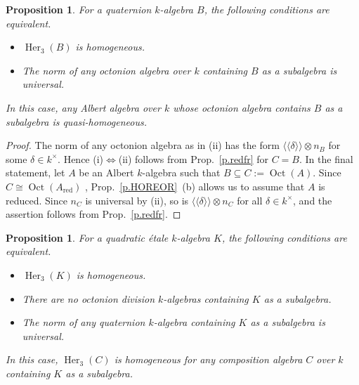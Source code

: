 \documentclass{amsart}
\newtheorem{prop}[equation]{Proposition}
\theoremstyle{definition} %
\theoremstyle{remark} %
\DeclareMathOperator{\red}{red}
\DeclareMathOperator{\Oct}{Oct}
\newcommand{\dla}{\langle\langle}
\newcommand{\dra}{\rangle\rangle}
\renewcommand{\:}{\colon\,}
\DeclareMathOperator{\Her}{Her}
\numberwithin{equation}{section}
\begin{document}
\begin{prop} \label{p.QUAHOM}
For a quaternion $k$-algebra $B$, the following conditions are equivalent. 
\begin{itemize}
\item [(i)] $\Her_3(B)$ is homogeneous.

\item [(ii)] The norm of any octonion algebra over $k$ containing $B$ as a subalgebra is universal.
\end{itemize}
In this case, any Albert algebra over $k$ whose octonion algebra contains $B$ as a subalgebra is quasi-homogeneous.
\end{prop}

\begin{proof}
The norm of any octonion algebra as in (ii) has the form $\dla\delta\dra \otimes n_B$ for some $\delta \in k^\times$. Hence (i)$\Leftrightarrow$(ii) follows from Prop.~\ref{p.redfr} for $C = B$. In the final statement, let $A$ be an Albert $k$-algebra such that $B \subseteq C := \Oct(A)$. Since $C \cong \Oct(A_{\red})$ , Prop.~\ref{p.HOREOR}~(b) allows us to assume that $A$ is reduced. Since $n_C$ is universal by (ii), so is $\dla\delta\dra \otimes n_C$ for all $\delta \in k^\times$, and the assertion follows from Prop.~\ref{p.redfr}.   
\end{proof}

\begin{prop} \label{p.ETAHOM}
For a quadratic \'etale $k$-algebra $K$, the following conditions are equivalent.
\begin{itemize}
\item [(i)] $\Her_3(K)$ is homogeneous.

\item [(ii)] There are no octonion division $k$-algebras containing $K$ as a subalgebra.

\item [(iii)] The norm of any quaternion $k$-algebra containing $K$ as a subalgebra is universal.
\end{itemize}
In this case, $\Her_3(C)$ is homogeneous for any composition algebra $C$ over $k$ containing $K$ as a subalgebra.
\end{prop}
\end{document}
